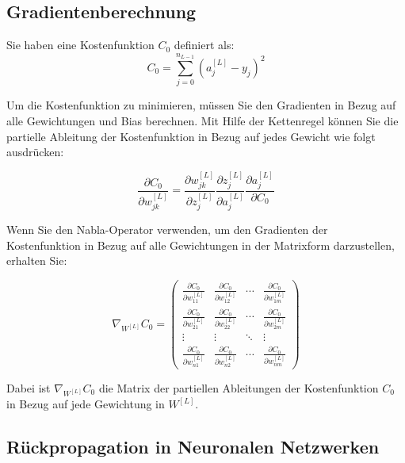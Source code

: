 
\subsection{Gradientenberechnung}

Sie haben eine Kostenfunktion \( C_0 \) definiert als:
\begin{equation}
C_0 = \sum_{j=0}^{n_{L-1}} (a_j^{[L]} - y_j)^2
\end{equation}

Um die Kostenfunktion zu minimieren, müssen Sie den Gradienten in Bezug auf alle Gewichtungen und Bias berechnen. Mit Hilfe der Kettenregel können Sie die partielle Ableitung der Kostenfunktion in Bezug auf jedes Gewicht wie folgt ausdrücken:

\begin{equation}
\frac{\partial C_0}{\partial w_{jk}^{[L]}} = \frac{\partial w_{jk}^{[L]}}{\partial z_j^{[L]}} \frac{\partial z_j^{[L]}}{\partial a_j^{[L]}} \frac{\partial a_j^{[L]}}{\partial C_0}
\end{equation}

Wenn Sie den Nabla-Operator verwenden, um den Gradienten der Kostenfunktion in Bezug auf alle Gewichtungen in der Matrixform darzustellen, erhalten Sie:

\begin{equation}
\nabla_{W^{[L]}} C_0 = \begin{pmatrix}
\frac{\partial C_0}{\partial w_{11}^{[L]}} & \frac{\partial C_0}{\partial w_{12}^{[L]}} & \cdots & \frac{\partial C_0}{\partial w_{1m}^{[L]}} \\
\frac{\partial C_0}{\partial w_{21}^{[L]}} & \frac{\partial C_0}{\partial w_{22}^{[L]}} & \cdots & \frac{\partial C_0}{\partial w_{2m}^{[L]}} \\
\vdots & \vdots & \ddots & \vdots \\
\frac{\partial C_0}{\partial w_{n1}^{[L]}} & \frac{\partial C_0}{\partial w_{n2}^{[L]}} & \cdots & \frac{\partial C_0}{\partial w_{nm}^{[L]}}
\end{pmatrix}
\end{equation}

Dabei ist \( \nabla_{W^{[L]}} C_0 \) die Matrix der partiellen Ableitungen der Kostenfunktion \( C_0 \) in Bezug auf jede Gewichtung in \( W^{[L]} \).



\subsection{Rückpropagation in Neuronalen Netzwerken}

